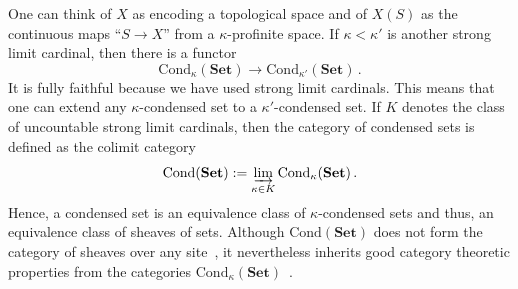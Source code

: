 \documentclass[12pt,a4paper]{article}
\numberwithin{equation}{section}
\theoremstyle{nonumberplain}
\begin{document}
One can think of $X$ as encoding a topological space and of $X(S)$ as the continuous maps ``$S \rightarrow X$'' from a $\kappa$-profinite space. If $\kappa < \kappa'$ is another strong limit cardinal, then there is a functor
\[ \mathrm{Cond}_{\kappa}(\mathbf{Set}) \rightarrow \mathrm{Cond}_{\kappa'}(\mathbf{Set}) \, . \]
It is fully faithful because we have used strong limit cardinals. This means that one can extend any $\kappa$-condensed set to a $\kappa'$-condensed set. If $K$ denotes the class of uncountable strong limit cardinals, then the category of condensed sets is defined as the colimit category
\[ \mathrm{Cond}(\mathbf{Set}) := \varinjlim_{\kappa \in K} \mathrm{Cond}_{\kappa}(\mathbf{Set}) \, . \]
Hence, a condensed set is an equivalence class of $\kappa$-condensed sets and thus, an equivalence class of sheaves of sets. Although $\mathrm{Cond}(\mathbf{Set})$ does not form the category of sheaves over any site~\cite[Remark~2.12]{sch19}, it nevertheless inherits good category theoretic properties from the categories $\mathrm{Cond}_{\kappa}(\mathbf{Set})$~\cite[p.~13]{sch22}. \\
\end{document}
